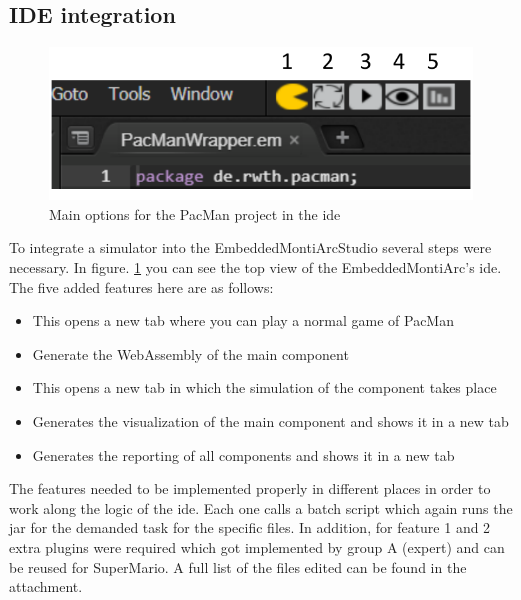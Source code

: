 \subsection{IDE integration}
\begin{figure}
	\label{fig:idePacmanTop}
	\centering
	\includegraphics[scale=0.55]{pictures/IDE-PacMan-Top.pdf}
	\caption{Main options for the PacMan project in the ide}
\end{figure}
To integrate a simulator into the EmbeddedMontiArcStudio several steps were necessary. In figure. \ref{fig:idePacmanTop} you can see the top view of the EmbeddedMontiArc's ide. The five added features here are as follows:
\begin{itemize}
	\item[1.] This opens a new tab where you can play a normal game of PacMan
	\item[2.] Generate the WebAssembly of the main component
	\item[3.] This opens a new tab in which the simulation of the component takes place
	\item[4.] Generates the visualization of the main component and shows it in a new tab
	\item[5.] Generates the reporting of all components and shows it in a new tab
\end{itemize}
The features needed to be implemented properly in different places in order to work along the logic of the ide. Each one calls a batch script which again runs the jar for the demanded task for the specific files. In addition, for feature 1 and 2 extra plugins were required which got implemented by group A (expert) and can be reused for SuperMario.
A full list of the files edited can be found in the attachment.

